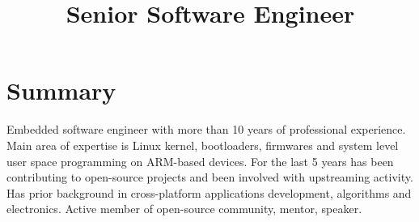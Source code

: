 \documentclass[11pt,letterpaper,sans]{moderncv}
\title{Senior Software Engineer}
\begin{document}
\maketitle

\section{Summary}

Embedded software engineer with more than 10 years of professional experience.
Main area of expertise is Linux kernel, bootloaders, firmwares and system level
user space programming on ARM-based devices. For the last 5 years has been
contributing to open-source projects and been involved with upstreaming
activity. Has prior background in cross-platform applications development,
algorithms and electronics. Active member of open-source community, mentor,
speaker.
\end{document}
